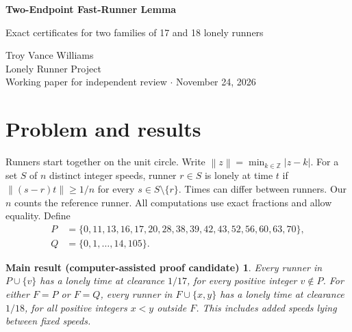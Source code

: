 \documentclass[11pt,letterpaper]{article}
\newtheorem*{claim}{Main result (computer-assisted proof candidate)}
\newcommand{\dist}[1]{\left\lVert #1\right\rVert}
\begin{document}
\begin{center}
{\LARGE\bfseries Two-Endpoint Fast-Runner Lemma\par}
\vspace{7pt}
{\large Exact certificates for two families of 17 and 18 lonely runners\par}
\vspace{12pt}
{\large Troy Vance Williams}\\
Lonely Runner Project\\
Working paper for independent review \(\cdot\) November 24, 2026
\end{center}

\begin{abstract}\noindent
Given a group of runners for which lonely times are known, what happens when one or two further speeds are prescribed? We give an endpoint test for whether one faster runner can block an entire safe interval. For a specified core of sixteen integer speeds, we give exact certificates that every runner has a lonely time after adding any one or any two distinct positive integer speeds outside the core. We obtain the two-addition result for a second core consisting of fifteen consecutive speeds and one outlier. This second test exposes a failure of a previously chosen time and leads to a modified time valid for both new runners under a diameter bound. The proofs combine interval estimates over unbounded speeds with finite certificates checked by a standalone program. The choice of sixteen fixed speeds remains a hypothesis of the all-runner conclusions.
\end{abstract}

\section{Problem and results}
Runners start together on the unit circle. Write \(\dist{z}=\min_{k\in\mathbb Z}|z-k|\). For a set \(S\) of \(n\) distinct integer speeds, runner \(r\in S\) is lonely at time \(t\) if \(\dist{(s-r)t}\ge 1/n\) for every \(s\in S\setminus\{r\}\). Times can differ between runners. Our \(n\) counts the reference runner. All computations use exact fractions and allow equality. Define
\[
\begin{split}
P&=\{0,11,13,16,17,20,28,38,39,42,43,52,56,60,63,70\},\\
Q&=\{0,1,\ldots,14,105\}.
\end{split}
\]
\begin{claim}
Every runner in \(P\cup\{v\}\) has a lonely time at clearance \(1/17\), for every positive integer \(v\notin P\). For either \(F=P\) or \(F=Q\), every runner in \(F\cup\{x,y\}\) has a lonely time at clearance \(1/18\), for all positive integers \(x<y\) outside \(F\). This includes added speeds lying between fixed speeds.
\end{claim}
\end{document}
